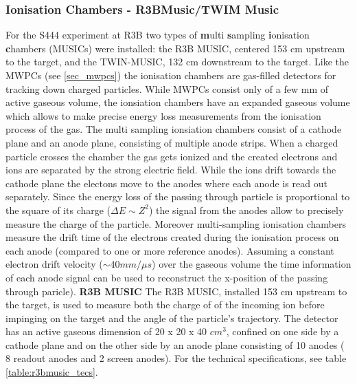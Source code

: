 \subsubsection{Ionisation Chambers - R3BMusic/TWIM Music}\label{sec:ionisation_chambers}
For the S444 experiment at R3B two types of \textbf{m}ulti \textbf{s}ampling \textbf{i}onisation \textbf{c}hambers (MUSICs) were installed: the R3B MUSIC, centered 153 cm upstream to the target, and the TWIN-MUSIC, 132 cm downstream to the target. Like the MWPCs (see \ref{sec_mwpcs}) the ionisation chambers are gas-filled detectors for tracking down charged particles. While MWPCs consist only of a few mm of active gaseous volume, the ionsiation chambers have an expanded gaseous volume which allows to make precise energy loss measurements from the ionisation process of the gas. The multi sampling ionsiation chambers consist of a cathode plane and an anode plane, consisting of multiple anode strips. When a charged particle crosses the chamber the gas gets ionized and the created electrons and ions are separated by the strong electric field. While the ions drift towards the cathode plane the electons move to the anodes where each anode is read out separately. Since the energy loss of the passing through particle is proportional to the square of its charge ($\Delta E \sim Z^2$) the signal from the anodes allow to precisely measure the charge of the particle. Moreover multi-sampling ionisation chambers measure the drift time of the electrons created during the ionisation process  on each anode (compared to one or more reference anodes). Assuming a constant electron drift velocity ($\sim 40 mm/\mu s$) over the gaseous volume the time information of each anode signal can be used to reconstruct the x-position of the passing through paricle).\newline
\textbf{R3B MUSIC}\newline
The R3B MUSIC, installed 153 cm upstream to the target, is used to measure both the  charge of of the incoming ion before impinging on the target and the angle of the particle's trajectory. The detector has an active gaseous dimension of 20 x 20 x 40 $cm^3$, confined on one side by a cathode plane and on the other side by an anode plane consisting of 10 anodes ( 8 readout anodes and 2 screen anodes). For the technical specifications, see table \ref{table:r3bmusic_tecs}. \newline
